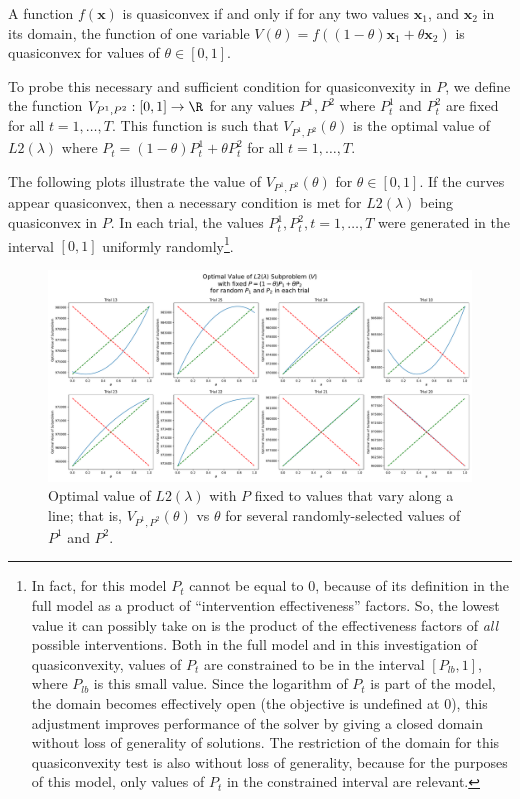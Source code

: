 \documentclass{article}
\begin{document}
A function $f(\bm{x})$ is quasiconvex if and only if for any two values $\bm{x}_1$, and $\bm{x}_2$ in its domain, the function of one variable $V(\theta) = f((1-\theta)\bm{x}_1 + \theta\bm{x}_2)$ is quasiconvex for values of $\theta\in[0,1]$.

To probe this necessary and sufficient condition for quasiconvexity in $P$, we define the function $V_{P^1,P^2}:[0,1]\rightarrow \R$ for any values $P^1, P^2$ where $P^1_t$ and $P^2_t$ are fixed for all $t=1,\ldots,T$. This function is such that $V_{P^1, P^2}(\theta)$ is the optimal value of $L2(\lambda)$ where $P_t = (1-\theta) P^1_t + \theta P^2_t$ for all $t=1,\ldots,T$.

The following plots illustrate the value of $V_{P^1,P^2}(\theta)$ for $\theta\in[0,1]$. If the curves appear quasiconvex, then a necessary condition is met for $L2(\lambda)$ being quasiconvex in $P$. In each trial, the values $P^1_t, P^2_t,t=1,\ldots,T$ were generated in the interval $[0,1]$ uniformly randomly\footnote{In fact, for this model $P_t$ cannot be equal to $0$, because of its definition in the full model as a product of ``intervention effectiveness'' factors. So, the lowest value it can possibly take on is the product of the effectiveness factors of \emph{all} possible interventions. Both in the full model and in this investigation of quasiconvexity, values of $P_t$ are constrained to be in the interval $[P_{lb},1]$, where $P_{lb}$ is this small value. Since the logarithm of $P_t$ is part of the model, the domain becomes effectively open (the objective is undefined at $0$), this adjustment improves performance of the solver by giving a closed domain without loss of generality of solutions. The restriction of the domain for this quasiconvexity test is also without loss of generality, because for the purposes of this model, only values of $P_t$ in the constrained interval are relevant.}.

\begin{figure}[H]
    \center
    \includegraphics[width=\linewidth]{figures/L2_quasiconvexity_test.pdf}
    \caption{Optimal value of $L2(\lambda)$ with $P$ fixed to values that vary along a line; that is, $V_{P^1,P^2}(\theta)$ vs $\theta$ for several randomly-selected values of $P^1$ and $P^2$.}\label{fig:quasiconvexity_test}
\end{figure}
\end{document}
